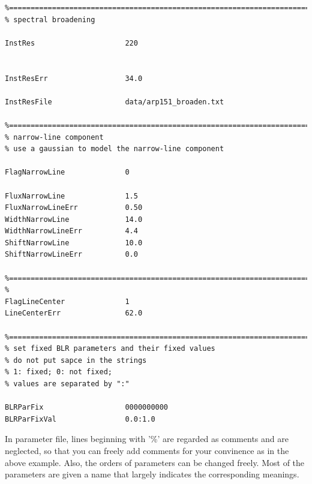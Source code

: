 \documentclass[oneside]{book}
\begin{document}
\begin{shaded}
\begin{verbatim}
%========================================================================
% spectral broadening

InstRes                     220                         
                                                         

InstResErr                  34.0                          

InstResFile                 data/arp151_broaden.txt       
                                                          
%========================================================================
% narrow-line component
% use a gaussian to model the narrow-line component

FlagNarrowLine              0                                                                               

FluxNarrowLine              1.5                        
FluxNarrowLineErr           0.50                        
WidthNarrowLine             14.0                        
WidthNarrowLineErr          4.4                         
ShiftNarrowLine             10.0                         
ShiftNarrowLineErr          0.0                        

%========================================================================
% 
FlagLineCenter              1
LineCenterErr               62.0                        

%========================================================================
% set fixed BLR parameters and their fixed values
% do not put sapce in the strings
% 1: fixed; 0: not fixed;
% values are separated by ":"

BLRParFix                   0000000000
BLRParFixVal                0.0:1.0           
\end{verbatim}
\end{shaded}

In parameter file, lines beginning with '\%' are regarded as comments and are neglected, so that you can freely add
comments for your convinence as in the above example. Also, the orders of parameters can be changed freely. Most
of the parameters are given a name that largely indicates the corresponding meanings.
\end{document}
